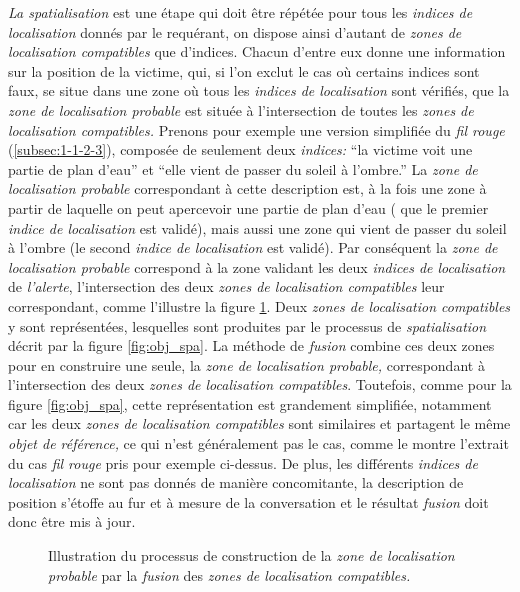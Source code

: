 \emph{La spatialisation} est une étape qui doit être répétée pour tous
les \emph{indices de localisation} donnés par le requérant, on dispose
ainsi d'autant de \emph{zones de localisation compatibles} que
d'indices. Chacun d'entre eux donne une information sur la position de
la victime, qui, si l'on exclut le cas où certains indices sont faux,
se situe dans une zone où tous les \emph{indices de localisation} sont
vérifiés, \ie que la \emph{zone de localisation probable} est située à
l'intersection de toutes les \emph{zones de localisation compatibles.}
%
Prenons pour exemple une version simplifiée du \emph{fil rouge}
(\ref{subsec:1-1-2-3}), composée de seulement deux \emph{indices:}
\enquote{la victime voit une partie de plan d'eau} et \enquote{elle
  vient de passer du soleil à l'ombre.}  La \emph{zone de localisation
  probable} correspondant à cette description est, à la fois une zone
à partir de laquelle on peut apercevoir une partie de plan d'eau (\ie
que le premier \emph{indice de localisation} est validé), mais aussi
une zone qui vient de passer du soleil à l'ombre (\ie le second
\emph{indice de localisation} est validé). Par conséquent la
\emph{zone de localisation probable} correspond à la zone validant les
deux \emph{indices de localisation} de \emph{l'alerte}, \ie
l'intersection des deux \emph{zones de localisation compatibles} leur
correspondant, comme l'illustre la figure \ref{fig:obj_fus}. Deux
\emph{zones de localisation compatibles} y sont représentées,
lesquelles sont produites par le processus de \emph{spatialisation}
décrit par la figure \ref{fig:obj_spa}. La méthode de \emph{fusion}
combine ces deux zones pour en construire une seule, la \emph{zone de
  localisation probable,} correspondant à l'intersection des deux
\emph{zones de localisation compatibles}. Toutefois, comme pour la
figure \ref{fig:obj_spa}, cette représentation est grandement
simplifiée, notamment car les deux \emph{zones de localisation
  compatibles} sont similaires et partagent le même \emph{objet de
  référence,} ce qui n'est généralement pas le cas, comme le montre
l'extrait du cas \emph{fil rouge} pris pour exemple ci-dessus. De
plus, les différents \emph{indices de localisation} ne sont pas donnés
de manière concomitante, la description de position s'étoffe au fur et
à mesure de la conversation et le résultat \emph{fusion} doit donc
être mis à jour.

\begin{figure}
  \centering
  
  \caption{Illustration du processus de construction de la \emph{zone
      de localisation probable} par la \emph{fusion} des \emph{zones
      de localisation compatibles.}}
  \label{fig:obj_fus}
\end{figure}

